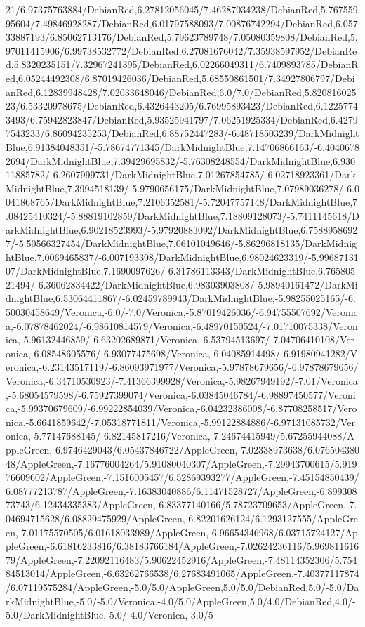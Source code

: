 {\begin{tikzternal}
21/6.97375763884/DebianRed,6.27812056045/7.46287034238/DebianRed,5.76755995604/7.49846928287/DebianRed,6.01797588093/7.00876742294/DebianRed,6.05733887193/6.85062713176/DebianRed,5.79623789748/7.05080359808/DebianRed,5.97011415906/6.99738532772/DebianRed,6.27081676042/7.35938597952/DebianRed,5.8320235151/7.32967241395/DebianRed,6.02266049311/6.7409893785/DebianRed,6.05244492308/6.87019426036/DebianRed,5.68550861501/7.34927806797/DebianRed,6.12839948428/7.02033648046/DebianRed,6.0/7.0/DebianRed,5.82081602523/6.53320978675/DebianRed,6.4326443205/6.76995893423/DebianRed,6.12257743493/6.75942823847/DebianRed,5.93525941797/7.06251925334/DebianRed,6.42797543233/6.86094235253/DebianRed,6.88752447283/-6.48718503239/DarkMidnightBlue,6.91384048351/-5.78674771345/DarkMidnightBlue,7.14706866163/-6.40406782694/DarkMidnightBlue,7.39429695832/-5.76308248554/DarkMidnightBlue,6.93011885782/-6.2607999731/DarkMidnightBlue,7.01267854785/-6.02718923361/DarkMidnightBlue,7.3994518139/-5.9790656175/DarkMidnightBlue,7.07989036278/-6.0041868765/DarkMidnightBlue,7.2106352581/-5.72047757148/DarkMidnightBlue,7.08425410324/-5.88819102859/DarkMidnightBlue,7.18809128073/-5.7411145618/DarkMidnightBlue,6.90218523993/-5.97920883092/DarkMidnightBlue,6.75889586927/-5.50566327454/DarkMidnightBlue,7.06101049646/-5.86296818135/DarkMidnightBlue,7.0069465837/-6.007193398/DarkMidnightBlue,6.98024623319/-5.9968713107/DarkMidnightBlue,7.1690097626/-6.31786113343/DarkMidnightBlue,6.76580521494/-6.36062834422/DarkMidnightBlue,6.98303903808/-5.98940161472/DarkMidnightBlue,6.53064411867/-6.02459789943/DarkMidnightBlue,-5.98255025165/-6.50030458649/Veronica,-6.0/-7.0/Veronica,-5.87019426036/-6.94755507692/Veronica,-6.07878462024/-6.98610814579/Veronica,-6.48970150524/-7.01710075338/Veronica,-5.96132446859/-6.63202689871/Veronica,-6.53794513697/-7.04706410108/Veronica,-6.08548605576/-6.93077475698/Veronica,-6.04085914498/-6.91980941282/Veronica,-6.23143517119/-6.86093971977/Veronica,-5.97878679656/-6.97878679656/Veronica,-6.34710530923/-7.41366399928/Veronica,-5.98267949192/-7.01/Veronica,-5.68054579598/-6.75927399074/Veronica,-6.03845046784/-6.98897450577/Veronica,-5.99370679609/-6.99222854039/Veronica,-6.04232386008/-6.87708258517/Veronica,-5.6641859642/-7.05318771811/Veronica,-5.99122884886/-6.97131085732/Veronica,-5.77147688145/-6.82145817216/Veronica,-7.24674415949/5.67255944088/AppleGreen,-6.9746429043/6.05437846722/AppleGreen,-7.02338973638/6.07650438048/AppleGreen,-7.16776004264/5.91080040307/AppleGreen,-7.29943700615/5.91976609602/AppleGreen,-7.1516005457/6.52869393277/AppleGreen,-7.45154850439/6.08777213787/AppleGreen,-7.16383040886/6.11471528727/AppleGreen,-6.89930873743/6.12434335383/AppleGreen,-6.83377140166/5.78723709653/AppleGreen,-7.04694715628/6.08829475929/AppleGreen,-6.82201626124/6.1293127555/AppleGreen,-7.01175570505/6.01618033989/AppleGreen,-6.96654346968/6.03715724127/AppleGreen,-6.61816233816/6.38183766184/AppleGreen,-7.02624236116/5.96981161679/AppleGreen,-7.22092116483/5.90622452916/AppleGreen,-7.48114352306/5.75484513014/AppleGreen,-6.63262766538/6.27683491065/AppleGreen,-7.40377117874/6.07119575284/AppleGreen,-5.0/5.0/AppleGreen,5.0/5.0/DebianRed,5.0/-5.0/DarkMidnightBlue,-5.0/-5.0/Veronica,-4.0/5.0/AppleGreen,5.0/4.0/DebianRed,4.0/-5.0/DarkMidnightBlue,-5.0/-4.0/Veronica,-3.0/5
\end{tikzternal}}
